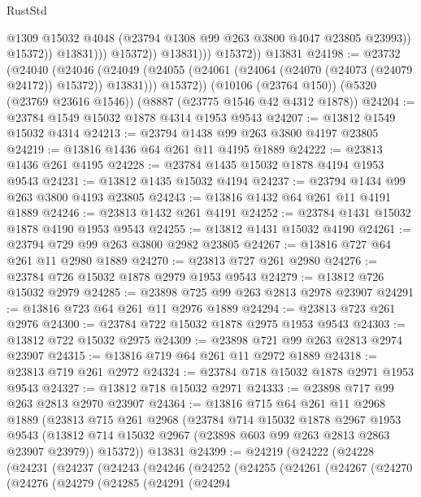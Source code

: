 \begin{lexlean}{RustStd}
\begin{coremodule}
                              @1309
                              @15032
                              @4048
                              (@23794 @1308 @99 @263 @3800 @4047 @23805 @23993))
                            @15372))
                        @13831)))
                  @15372))
              @13831)))
        @15372))
    @13831
@24198 := @23732
    (@24040
      (@24046
        (@24049 (@24055 (@24061 (@24064 (@24070 (@24073 (@24079 @24172)) @15372)) @13831)))
        @15372))
    (@10106 (@23764 @150))
    (@5320 (@23769 @23616 @1546))
    (@8887 (@23775 @1546 @42 @4312 @1878))
@24204 := @23784 @1549 @15032 @1878 @4314 @1953 @9543
@24207 := @13812 @1549 @15032 @4314
@24213 := @23794 @1438 @99 @263 @3800 @4197 @23805
@24219 := @13816 @1436 @64 @261 @11 @4195 @1889
@24222 := @23813 @1436 @261 @4195
@24228 := @23784 @1435 @15032 @1878 @4194 @1953 @9543
@24231 := @13812 @1435 @15032 @4194
@24237 := @23794 @1434 @99 @263 @3800 @4193 @23805
@24243 := @13816 @1432 @64 @261 @11 @4191 @1889
@24246 := @23813 @1432 @261 @4191
@24252 := @23784 @1431 @15032 @1878 @4190 @1953 @9543
@24255 := @13812 @1431 @15032 @4190
@24261 := @23794 @729 @99 @263 @3800 @2982 @23805
@24267 := @13816 @727 @64 @261 @11 @2980 @1889
@24270 := @23813 @727 @261 @2980
@24276 := @23784 @726 @15032 @1878 @2979 @1953 @9543
@24279 := @13812 @726 @15032 @2979
@24285 := @23898 @725 @99 @263 @2813 @2978 @23907
@24291 := @13816 @723 @64 @261 @11 @2976 @1889
@24294 := @23813 @723 @261 @2976
@24300 := @23784 @722 @15032 @1878 @2975 @1953 @9543
@24303 := @13812 @722 @15032 @2975
@24309 := @23898 @721 @99 @263 @2813 @2974 @23907
@24315 := @13816 @719 @64 @261 @11 @2972 @1889
@24318 := @23813 @719 @261 @2972
@24324 := @23784 @718 @15032 @1878 @2971 @1953 @9543
@24327 := @13812 @718 @15032 @2971
@24333 := @23898 @717 @99 @263 @2813 @2970 @23907
@24364 := @13816
    @715
    @64
    @261
    @11
    @2968
    @1889
    (@23813
      @715
      @261
      @2968
      (@23784
        @714
        @15032
        @1878
        @2967
        @1953
        @9543
        (@13812 @714 @15032 @2967 (@23898 @603 @99 @263 @2813 @2863 @23907 @23979))
        @15372))
    @13831
@24399 := @24219
    (@24222
      (@24228
        (@24231
          (@24237
            (@24243
              (@24246
                (@24252
                  (@24255
                    (@24261
                      (@24267
                        (@24270
                          (@24276
                            (@24279
                              (@24285
                                (@24291
                                  (@24294

\end{coremodule}
\end{lexlean}
